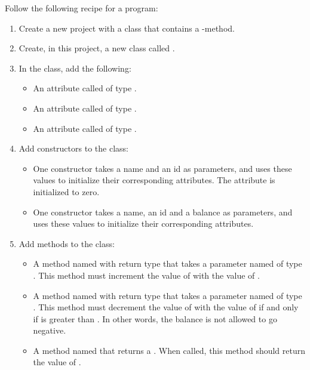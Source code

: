 Follow the following recipe for a program:
\begin{enumerate}
  \item Create a new project with a class that contains a -method.
  \item Create, in this project, a new class called .
  \item In the  class, add the following:
    \begin{itemize}
      \item An attribute called  of type .
      \item An attribute called  of type . %
      \item An attribute called  of type .
    \end{itemize}
  \item Add constructors to the  class:
    \begin{itemize}
      \item One constructor takes a name and an id as parameters, and uses these values to initialize their corresponding attributes. The  attribute is initialized to zero.
      \item One constructor takes a name, an id and a balance as parameters, and uses these values to initialize their corresponding attributes.
    \end{itemize}
  \item Add methods to the  class:
    \begin{itemize}
      \item A method named  with  return type that takes a parameter named  of type . This method must increment the value of  with the value of .
      \item A method named  with  return type that takes a parameter named  of type . This method must decrement the value of  with the value of  if and only if  is greater than . In other words, the balance is not allowed to go negative.
      \item A method named  that returns a . When called, this method should return the value of .

\end{itemize}
\end{enumerate}
